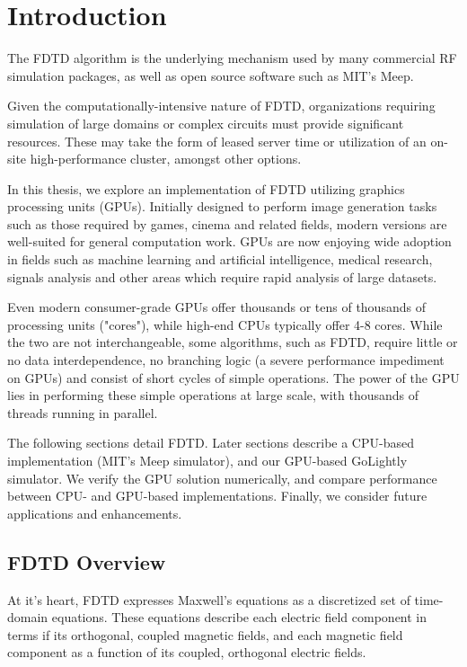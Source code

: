 \chapter{Introduction} \label{ch:introduction}

The FDTD \cite{Yee} algorithm is the underlying mechanism used by many commercial RF simulation packages, as well as open source software such as MIT's Meep. 

Given the computationally-intensive nature of FDTD, organizations requiring simulation of large domains or complex circuits must provide significant resources. These may take the form of leased server time or utilization of an on-site high-performance cluster, amongst other options.

In this thesis, we explore an implementation of FDTD utilizing graphics processing units (GPUs). Initially designed to perform image generation tasks such as those required by games, cinema and related fields, modern versions are well-suited for general computation work. GPUs are now enjoying wide adoption in fields such as machine learning and artificial intelligence, medical research, signals analysis and other areas which require rapid analysis of large datasets.

Even modern consumer-grade GPUs offer thousands or tens of thousands of processing units ("cores"), while high-end CPUs typically offer 4-8 cores. While the two are not interchangeable, some algorithms, such as FDTD, require little or no data interdependence, no branching logic (a severe performance impediment on GPUs) and consist of short cycles of simple operations. The power of the GPU lies in performing these simple operations at large scale, with thousands of threads running in parallel. 

The following sections detail FDTD. Later sections describe a CPU-based implementation (MIT's  Meep simulator), and our GPU-based GoLightly simulator. We verify the GPU solution numerically, and compare performance between CPU- and GPU-based implementations. Finally, we consider future applications and enhancements. 


\section{FDTD Overview}

At it's heart, FDTD expresses Maxwell's equations as a discretized set of time-domain equations. These equations describe each electric field component in terms if its orthogonal, coupled magnetic fields, and each magnetic field component as a function of its coupled, orthogonal electric fields.


